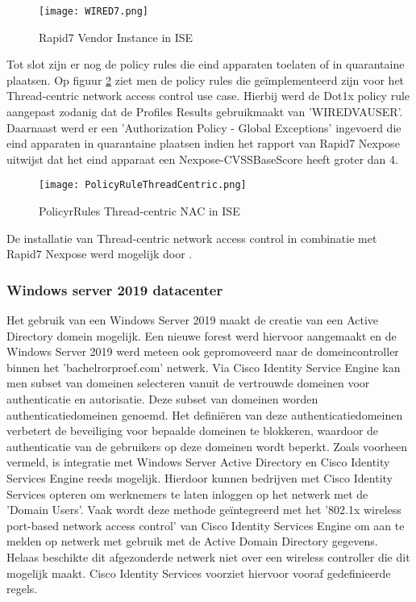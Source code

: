  \begin{figure}[H]
	 	\centering
	 	\texttt{[image: WIRED7.png]}
	 	\caption{Rapid7 Vendor Instance in ISE}%
	 	\label{fig:WIRED}%
 \end{figure}

Tot slot zijn er nog de policy rules die eind apparaten toelaten of in
quarantaine plaatsen. Op figuur \ref{fig:quarin} ziet men de policy rules die geïmplementeerd zijn voor het Thread-centric network access control use case. Hierbij werd de Dot1x policy rule aangepast zodanig dat de Profiles Results gebruikmaakt van 'WIRED\textunderscore VA\textunderscore USER'. Daarnaast werd er een 'Authorization Policy - Global Exceptions' ingevoerd die eind apparaten in quarantaine plaatsen indien het rapport van Rapid7 Nexpose uitwijst dat het eind apparaat een Nexpose-CVSS\textunderscore Base\textunderscore Score heeft groter dan 4. 

  \begin{figure}[H]
 	\centering
 	\texttt{[image: PolicyRuleThreadCentric.png]}
 	\caption{PolicyrRules Thread-centric NAC in ISE}%
 	\label{fig:quarin}%
 \end{figure}
 
 De installatie van Thread-centric network access control in combinatie met Rapid7 Nexpose werd mogelijk door \cite{thread_yt}.

 


\subsubsection{Windows server 2019 datacenter}
Het gebruik van een Windows Server 2019 maakt de creatie van een Active Directory domein mogelijk. Een nieuwe forest werd hiervoor aangemaakt en de Windows Server 2019 werd meteen ook gepromoveerd naar de domeincontroller binnen het 'bachelrorproef.com' netwerk.
\newline
\newline
Via Cisco Identity Service Engine kan men subset van domeinen selecteren vanuit de vertrouwde domeinen voor authenticatie en autorisatie. Deze subset van domeinen worden authenticatiedomeinen genoemd. Het definiëren van deze authenticatiedomeinen verbetert de beveiliging voor bepaalde domeinen te blokkeren, waardoor de authenticatie van de gebruikers op deze domeinen wordt beperkt.
\newline
\newline
Zoals voorheen vermeld, is integratie met Windows Server Active Directory en Cisco Identity Services Engine reeds mogelijk. Hierdoor kunnen bedrijven met Cisco Identity Services opteren om werknemers te laten inloggen op het netwerk met de 'Domain Users’. Vaak wordt deze methode geïntegreerd met het '802.1x wireless port-based network access control' van Cisco Identity Services Engine om aan te melden op netwerk met gebruik met de Active Domain Directory gegevens. Helaas beschikte dit afgezonderde netwerk niet over een wireless controller die dit mogelijk maakt. Cisco Identity Services voorziet hiervoor vooraf gedefinieerde regels.

